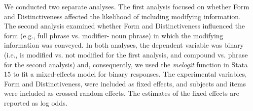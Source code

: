 \documentclass[output=paper]{langsci/langscibook}
\begin{document}
\begin{table}
  \caption{Number of responses and row percentages (in parentheses)
    for each condition that were modifier-noun phrase, full phrase,
    head noun only, or other. Each row sums to 364.}
  \label{tab:no-responses}
\end{table}

We conducted two separate analyses. The first analysis focused on
whether Form and Distinctiveness affected the likelihood of including
modifying information. The second analysis examined whether Form and
Distinctiveness influenced the form (e.g., full phrase vs. modifier-
noun phrase) in which the modifying information was conveyed. In both
analyses, the dependent variable was binary (i.e., is modified vs. not
modified for the first analysis, and compound vs.  phrase for the
second analysis) and, consequently, we used the \textit{melogit}
function in Stata 15 to fit a mixed-effects model for binary
responses. The experimental variables, Form and Distinctiveness, were
included as fixed effects, and subjects and items were included as
crossed random effects. The estimates of the fixed effects are
reported as log odds.
\end{document}
